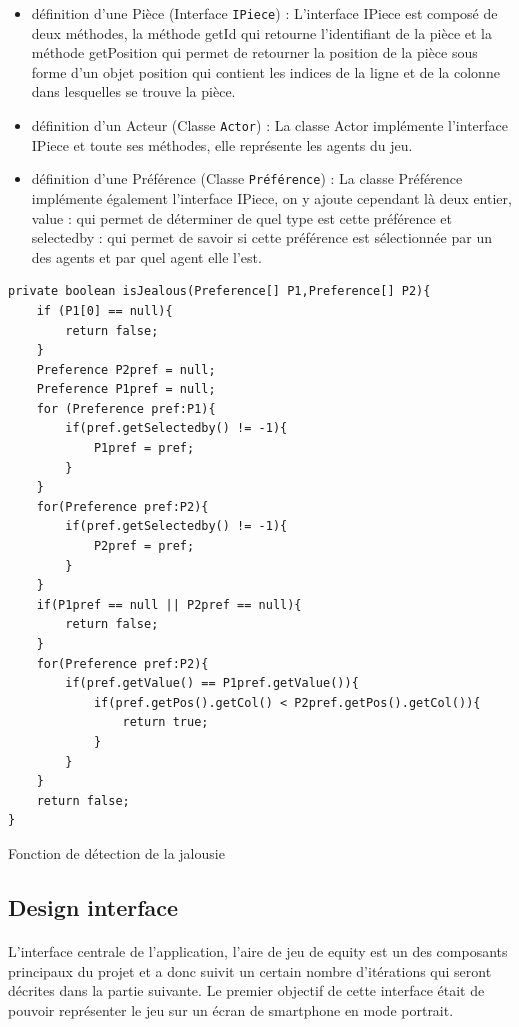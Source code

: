 \documentclass[../main.tex]{subfiles}
\begin{document}
 \begin{itemize}
\item définition d'une Pièce (Interface \texttt{IPiece}) : L’interface IPiece est composé de deux méthodes, la méthode getId qui retourne l'identifiant de la pièce et la méthode getPosition qui permet de retourner la position de la pièce sous forme d’un objet position qui contient les indices de la ligne et de la colonne dans lesquelles se trouve la pièce.   
\item définition d’un Acteur (Classe \texttt{Actor}) : La classe Actor implémente l'interface IPiece et toute ses méthodes, elle représente les agents du jeu.                                                                                                                                                                                                                                                                                                                                      
\item définition d’une Préférence (Classe \texttt{Préférence}) : La classe Préférence implémente également l’interface IPiece, on y ajoute cependant là deux entier, value : qui permet de déterminer de quel type est cette préférence et selectedby : qui permet de savoir si cette préférence est sélectionnée par un des agents et par quel agent elle l’est. 
\end{itemize}
\hfill \break
\begin{lstlisting}
private boolean isJealous(Preference[] P1,Preference[] P2){
    if (P1[0] == null){
        return false;
    }
    Preference P2pref = null;
    Preference P1pref = null;
    for (Preference pref:P1){
        if(pref.getSelectedby() != -1){
            P1pref = pref;
        }
    }
    for(Preference pref:P2){
        if(pref.getSelectedby() != -1){
            P2pref = pref;
        }
    }
    if(P1pref == null || P2pref == null){
        return false;
    }
    for(Preference pref:P2){
        if(pref.getValue() == P1pref.getValue()){
            if(pref.getPos().getCol() < P2pref.getPos().getCol()){
                return true;
            }
        }
    }
    return false;
}
\end{lstlisting}
Fonction de détection de la jalousie 

	\subsection{Design interface}
	
\paragraph{}
L’interface centrale de  l’application, l’aire de jeu de equity est un des composants principaux du projet et a donc suivit un certain nombre d'itérations qui seront décrites dans la partie suivante. Le premier objectif de cette interface était de pouvoir représenter le jeu sur un écran de smartphone en mode portrait.
\end{document}
